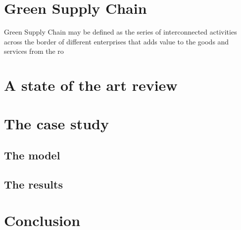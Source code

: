 \documentclass{article}
\begin{document}
\section{Green Supply Chain}
Green Supply Chain may be defined as the series of interconnected activities across the border of different enterprises that adds value to the goods and services from the ro


\section{A state of the art review}

\section{The case study}
\subsection{The model}
\subsection{The results}

\section{Conclusion}
\end{document}
